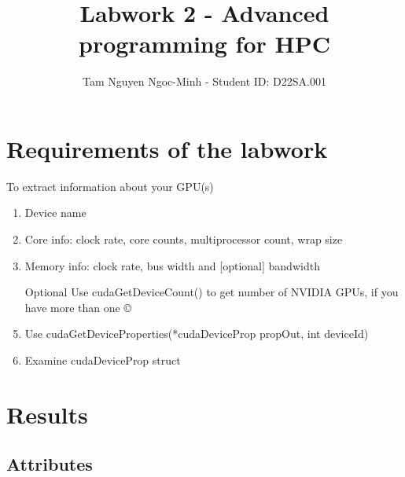 \documentclass{article}
\title{Labwork 2 - Advanced programming for HPC}
\author{Tam Nguyen Ngoc-Minh   - Student ID: D22SA.001}
\begin{document}
\maketitle

\section{Requirements of the labwork}

 To extract information about your GPU(s)
\begin{enumerate}
    \item Device name
    \item Core info: clock rate, core counts, multiprocessor count,
wrap size
    \item Memory info: clock rate, bus width and [optional] bandwidth
    \item [Optional] Use cudaGetDeviceCount() to get number of
NVIDIA GPUs, if you have more than one ©
    \item Use cudaGetDeviceProperties(*cudaDeviceProp
propOut, int deviceId)
    \item Examine cudaDeviceProp struct
    
\end{enumerate}


\section{Results}

\subsection{Attributes}
\end{document}
